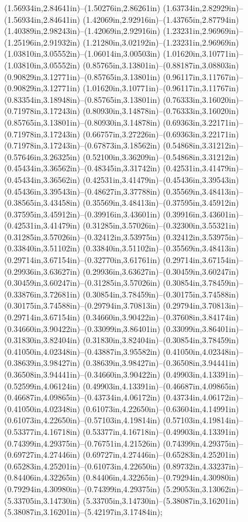 (1.56934in,2.84641in)--(1.50276in,2.86261in) (1.63734in,2.82929in)--(1.56934in,2.84641in) (1.42069in,2.92916in)--(1.43765in,2.87794in) (1.40389in,2.98243in)--(1.42069in,2.92916in) (1.23231in,2.96969in)--(1.25196in,2.91932in) (1.21280in,3.02192in)--(1.23231in,2.96969in) (1.03810in,3.05552in)--(1.06014in,3.00503in) (1.01620in,3.10771in)--(1.03810in,3.05552in) (0.85765in,3.13801in)--(0.88187in,3.08803in) (0.90829in,3.12771in)--(0.85765in,3.13801in) (0.96117in,3.11767in)--(0.90829in,3.12771in) (1.01620in,3.10771in)--(0.96117in,3.11767in) (0.83354in,3.18948in)--(0.85765in,3.13801in) (0.76333in,3.16020in)--(0.71978in,3.17243in) (0.80930in,3.14878in)--(0.76333in,3.16020in) (0.85765in,3.13801in)--(0.80930in,3.14878in) (0.69363in,3.22171in)--(0.71978in,3.17243in) (0.66757in,3.27226in)--(0.69363in,3.22171in) (0.71978in,3.17243in)--(0.67873in,3.18562in) (0.54868in,3.31212in)--(0.57646in,3.26325in) (0.52100in,3.36209in)--(0.54868in,3.31212in) (0.45434in,3.36562in)--(0.48345in,3.31742in) (0.42531in,3.41479in)--(0.45434in,3.36562in) (0.42531in,3.41479in)--(0.45436in,3.39543in) (0.45436in,3.39543in)--(0.48627in,3.37788in) (0.35569in,3.48413in)--(0.38565in,3.43458in) (0.35569in,3.48413in)--(0.37595in,3.45912in) (0.37595in,3.45912in)--(0.39916in,3.43601in) (0.39916in,3.43601in)--(0.42531in,3.41479in) (0.31285in,3.57026in)--(0.32300in,3.55321in) (0.31285in,3.57026in)--(0.32412in,3.53975in) (0.32412in,3.53975in)--(0.33840in,3.51102in) (0.33840in,3.51102in)--(0.35569in,3.48413in) (0.29714in,3.67154in)--(0.32770in,3.61761in) (0.29714in,3.67154in)--(0.29936in,3.63627in) (0.29936in,3.63627in)--(0.30459in,3.60247in) (0.30459in,3.60247in)--(0.31285in,3.57026in) (0.30854in,3.78459in)--(0.33876in,3.72681in) (0.30854in,3.78459in)--(0.30175in,3.74588in) (0.30175in,3.74588in)--(0.29794in,3.70813in) (0.29794in,3.70813in)--(0.29714in,3.67154in) (0.34660in,3.90422in)--(0.37608in,3.84174in) (0.34660in,3.90422in)--(0.33099in,3.86401in) (0.33099in,3.86401in)--(0.31830in,3.82404in) (0.31830in,3.82404in)--(0.30854in,3.78459in) (0.41050in,4.02348in)--(0.43887in,3.95582in) (0.41050in,4.02348in)--(0.38639in,3.98427in) (0.38639in,3.98427in)--(0.36508in,3.94441in) (0.36508in,3.94441in)--(0.34660in,3.90422in) (0.49903in,4.13391in)--(0.52599in,4.06124in) (0.49903in,4.13391in)--(0.46687in,4.09865in) (0.46687in,4.09865in)--(0.43734in,4.06172in) (0.43734in,4.06172in)--(0.41050in,4.02348in) (0.61073in,4.22650in)--(0.63604in,4.14991in) (0.61073in,4.22650in)--(0.57103in,4.19814in) (0.57103in,4.19814in)--(0.53377in,4.16718in) (0.53377in,4.16718in)--(0.49903in,4.13391in) (0.74399in,4.29375in)--(0.76751in,4.21526in) (0.74399in,4.29375in)--(0.69727in,4.27446in) (0.69727in,4.27446in)--(0.65283in,4.25201in) (0.65283in,4.25201in)--(0.61073in,4.22650in) (0.89732in,4.33237in)--(0.84406in,4.32265in) (0.84406in,4.32265in)--(0.79294in,4.30980in) (0.79294in,4.30980in)--(0.74399in,4.29375in) (5.29053in,3.13062in)--(5.33705in,3.14730in) (5.33705in,3.14730in)--(5.38087in,3.16201in) (5.38087in,3.16201in)--(5.42197in,3.17484in);
